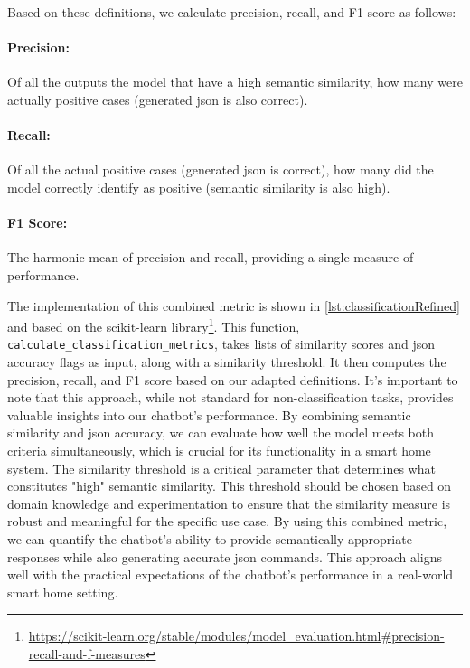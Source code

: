 Based on these definitions, we calculate precision, recall, and F1 score as follows:

\paragraph{Precision:} Of all the outputs the model that have a high semantic similarity, how many were actually positive cases (generated \gls{json} is also correct).
\paragraph{Recall:} Of all the actual positive cases (generated \gls{json} is correct), how many did the model correctly identify as positive (semantic similarity is also high).
\paragraph{F1 Score:} The harmonic mean of precision and recall, providing a single measure of performance.

The implementation of this combined metric is shown in \cref{lst:classificationRefined} and based on the scikit-learn library\footnote{\url{https://scikit-learn.org/stable/modules/model\_evaluation.html\#precision-recall-and-f-measures}}. This function, \texttt{calculate\_classification\_metrics}, takes lists of similarity scores and \gls{json} accuracy flags as input, along with a similarity threshold. It then computes the precision, recall, and F1 score based on our adapted definitions.
It's important to note that this approach, while not standard for non-classification tasks, provides valuable insights into our chatbot's performance. By combining semantic similarity and \gls{json} accuracy, we can evaluate how well the model meets both criteria simultaneously, which is crucial for its functionality in a smart home system.
The similarity threshold is a critical parameter that determines what constitutes "high" semantic similarity. This threshold should be chosen based on domain knowledge and experimentation to ensure that the similarity measure is robust and meaningful for the specific use case.
By using this combined metric, we can quantify the chatbot's ability to provide semantically appropriate responses while also generating accurate \gls{json} commands. This approach aligns well with the practical expectations of the chatbot's performance in a real-world smart home setting.

